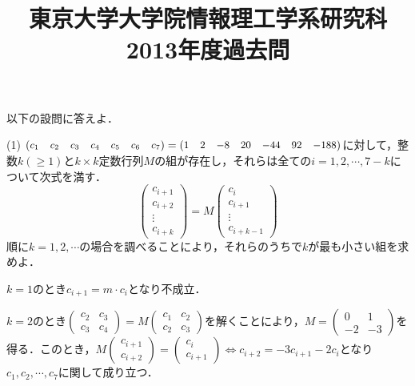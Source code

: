 \documentclass[a4j]{jarticle}
\title{東京大学大学院情報理工学系研究科2013年度過去問}
\author{}
\date{}
\let \ds \displaystyle
\begin{document}
\thispagestyle{empty}
\maketitle
\pagebreak

\section{}

\begin{screen}
 以下の設問に答えよ．
\end{screen}

\begin{screen}
 (1) $\small\begin{pmatrix}c_1&c_2&c_3&c_4&c_5&c_6&c_7 \end{pmatrix}=\small\begin{pmatrix}1&2&-8&20&-44&92&-188 \end{pmatrix}$に対して，整数$k(\geq 1)$と$k \times k$定数行列$M$の組が存在し，それらは全ての$i=1,2,\cdots,7-k$について次式を満す．
 $$\left(\begin{array}{c} c_{i+1}\\ c_{i+2} \\ \vdots \\ c_{i+k} \end{array} \right) =  M \left(\begin{array}{c} c_{i}\\ c_{i+1} \\ \vdots \\ c_{i+k-1} \end{array} \right)$$
 順に$k=1,2,\cdots$の場合を調べることにより，それらのうちで$k$が最も小さい組を求めよ．
\end{screen}

$k=1$のとき$c_{i+1} = m\cdot c_i$となり不成立．

$k=2$のとき$\ds \begin{pmatrix}c_2 & c_3 \\ c_3 & c_4\end{pmatrix}=M\begin{pmatrix}c_1 & c_2 \\ c_2 & c_3\end{pmatrix}$を解くことにより，$M=\begin{pmatrix}0 & 1 \\ -2 & -3\end{pmatrix}$を得る．このとき，$\ds M\begin{pmatrix}c_{i+1} \\ c_{i+2}\end{pmatrix} = \begin{pmatrix}c_{i} \\ c_{i+1}\end{pmatrix} \Leftrightarrow c_{i+2} = -3c_{i+1}-2c_i$となり$c_1,c_2,\cdots,c_7$に関して成り立つ．
\end{document}
